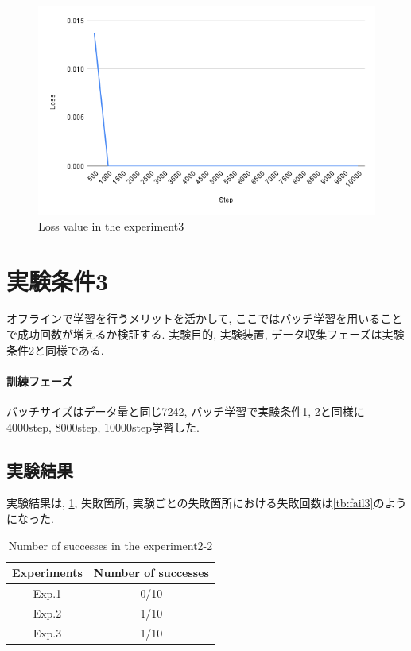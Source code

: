 \begin{figure}[h]
  \centering
  \includegraphics[keepaspectratio, scale=0.31]{images/exp2-10000.png}
  \caption{Loss value in the experiment3}
  \label{Fig:exp2-10000}
  \end{figure}
  
\newpage
\section{実験条件3}
オフラインで学習を行うメリットを活かして, ここではバッチ学習を用いることで成功回数が増えるか検証する. 実験目的, 実験装置, データ収集フェーズは実験条件2と同様である. 

\paragraph{訓練フェーズ}
バッチサイズはデータ量と同じ7242, バッチ学習で実験条件1, 2と同様に4000step, 8000step, 10000step学習した. 

\subsection{実験結果}
実験結果は, \ref{tb:exp3}, 失敗箇所, 実験ごとの失敗箇所における失敗回数は\ref{tb:fail3}のようになった.

\begin{table}[h]
  \centering
  \begin{tabular}{|c|c|} \hline
    Experiments & Number of successes \\ \hline
    Exp.1 & 0/10 \\ \hline
    Exp.2 & 1/10 \\ \hline
    Exp.3 & 1/10 \\ \hline
  \end{tabular}
  \caption{Number of successes in the experiment2-2}
  \label{tb:exp3}
\end{table}

